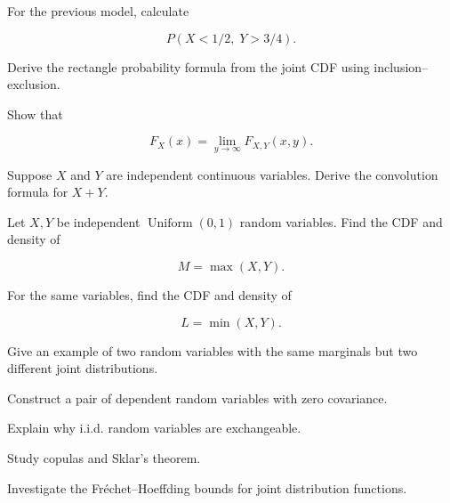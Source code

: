 \begin{exercise}[3]
For the previous model, calculate

\[
P(X<1/2,\;Y>3/4).
\]
\end{exercise}

\begin{exercise}[3]
Derive the rectangle probability formula from the joint CDF using
inclusion--exclusion.
\end{exercise}

\begin{exercise}[3]
Show that

\[
F_X(x)
=
\lim_{y\to\infty}
F_{X,Y}(x,y).
\]
\end{exercise}

\begin{exercise}[3]
Suppose \(X\) and \(Y\) are independent continuous variables. Derive
the convolution formula for \(X+Y\).
\end{exercise}

\begin{exercise}[3]
Let \(X,Y\) be independent \(\operatorname{Uniform}(0,1)\) random
variables. Find the CDF and density of

\[
M=\max(X,Y).
\]
\end{exercise}

\begin{exercise}[3]
For the same variables, find the CDF and density of

\[
L=\min(X,Y).
\]
\end{exercise}

\begin{exercise}[3]
Give an example of two random variables with the same marginals but two
different joint distributions.
\end{exercise}

\begin{exercise}[3]
Construct a pair of dependent random variables with zero covariance.
\end{exercise}

\begin{exercise}[3]
Explain why i.i.d. random variables are exchangeable.
\end{exercise}

\begin{exercise}[4]
Study copulas and Sklar's theorem.
\end{exercise}

\begin{exercise}[4]
Investigate the Fr\'echet--Hoeffding bounds for joint distribution
functions.
\end{exercise}

